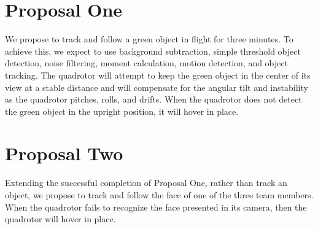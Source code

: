 \documentclass{article}
\begin{document}
\begin{spacing}{1.1}
\section{Proposal One}
We propose to track and follow a green object in flight for three
minutes. To achieve this, we expect to use background subtraction,
simple threshold object detection, noise filtering, moment
calculation, motion detection, and object tracking. The quadrotor
will attempt to keep the green object in the center of its view at a
stable distance and will compensate for the angular tilt and
instability as the quadrotor pitches, rolls, and drifts. When the
quadrotor does not detect the green object in the upright position,
it will hover in place.

\section{Proposal Two}
Extending the successful completion of Proposal One, rather than track
an object, we propose to track and follow the face of one of the three
team members. When the quadrotor fails to recognize the face presented
in its camera, then the quadrotor will hover in place.

\end{spacing}
\end{document}
